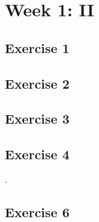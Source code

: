\documentclass[a4paper]{article}
\let\stdsection\section
\renewcommand\section{\newpage\stdsection}
\begin{document}
\section*{Week 1: II}

\subsection*{Exercise 1}


\newpage
\subsection*{Exercise 2}


\newpage
\subsection*{Exercise 3}







\newpage
\subsection*{Exercise 4}






\newpage
.
\newpage
\subsection*{Exercise 6}




\newpage

\end{document}
